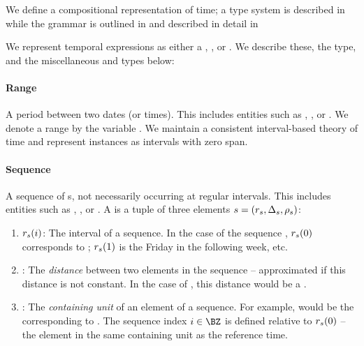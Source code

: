 We define a compositional representation of time; a type system 
	is described in  while the grammar is outlined in
	 and described in detail in 

We represent temporal expressions as either a , ,
	or .
We describe these, the  type, and the miscellaneous
	 and  types below:
\paragraph{Range}
A period between two dates (or times).
This includes entities such as , , or
	.
We denote a range by the variable \range.
We maintain a consistent interval-based theory of time
	\cite{key:1981allen-temporal} and represent instances as intervals with
	zero span.

\paragraph{Sequence}
A sequence of s, not necessarily occurring at regular intervals.
This includes entities such as , , or
	.
A  is a tuple of three elements
	$s=(r_s,\Delta_s,\rho_s)$:
\begin{enumerate}
	\setlength{\itemsep}{-5pt} 
	\item $r_s(i)$: 
		The  interval of a sequence.
		In the case of the sequence , $r_s(0)$ corresponds to
			; 
			$r_s(1)$ is the Friday in the following week, etc.
	\item \seqjump:
		The \textit{distance} between two elements in the sequence -- approximated
			if this distance is not constant.
		In the case of , this distance would be a .
	\item \seqcanon:
		The \textit{containing unit} of an element of a sequence.
		For example,  would be the 
			corresponding to .
		The sequence index $i \in \BZ$ is defined relative to $r_s(0)$ --
			the element in the same containing unit as the reference time.
\end{enumerate}

